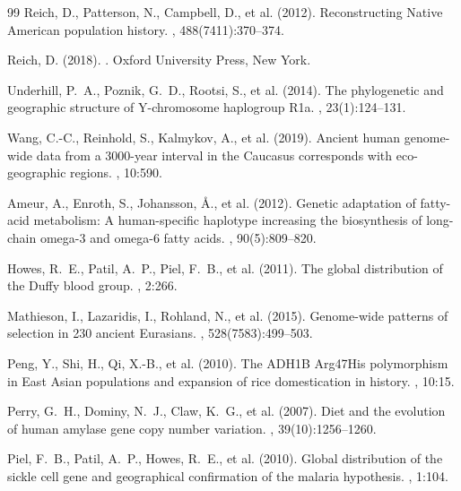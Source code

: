 \documentclass[11pt,letterpaper]{article}
\begin{document}
\begin{thebibliography}{99}
Reich, D., Patterson, N., Campbell, D., et al. (2012).
\newblock Reconstructing Native American population history.
, 488(7411):370--374.

Reich, D. (2018).
.
\newblock Oxford University Press, New York.

Underhill, P.~A., Poznik, G.~D., Rootsi, S., et al. (2014).
\newblock The phylogenetic and geographic structure of Y-chromosome haplogroup R1a.
, 23(1):124--131.

Wang, C.-C., Reinhold, S., Kalmykov, A., et al. (2019).
\newblock Ancient human genome-wide data from a 3000-year interval in the Caucasus corresponds with eco-geographic regions.
, 10:590.

Ameur, A., Enroth, S., Johansson, \AA., et al. (2012).
\newblock Genetic adaptation of fatty-acid metabolism: A human-specific haplotype increasing the biosynthesis of long-chain omega-3 and omega-6 fatty acids.
, 90(5):809--820.

Howes, R.~E., Patil, A.~P., Piel, F.~B., et al. (2011).
\newblock The global distribution of the Duffy blood group.
, 2:266.

Mathieson, I., Lazaridis, I., Rohland, N., et al. (2015).
\newblock Genome-wide patterns of selection in 230 ancient Eurasians.
, 528(7583):499--503.

Peng, Y., Shi, H., Qi, X.-B., et al. (2010).
\newblock The ADH1B Arg47His polymorphism in East Asian populations and expansion of rice domestication in history.
, 10:15.

Perry, G.~H., Dominy, N.~J., Claw, K.~G., et al. (2007).
\newblock Diet and the evolution of human amylase gene copy number variation.
, 39(10):1256--1260.

Piel, F.~B., Patil, A.~P., Howes, R.~E., et al. (2010).
\newblock Global distribution of the sickle cell gene and geographical confirmation of the malaria hypothesis.
, 1:104.


\end{thebibliography}
\end{document}
